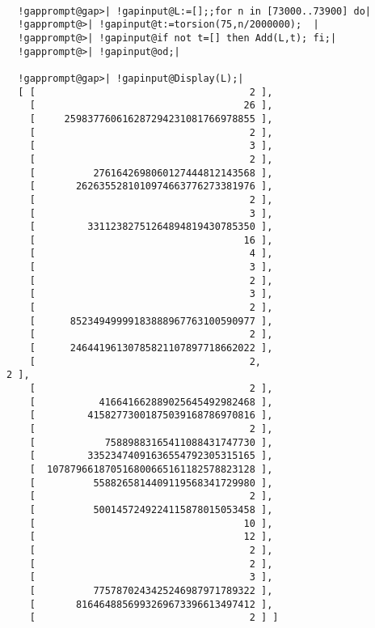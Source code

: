 \documentclass[a4paper,11pt]{report}
\begin{document}
{{\begin{Verbatim}[commandchars=!@|,fontsize=\small,frame=single,label=Example]
  
  !gapprompt@gap>| !gapinput@L:=[];;for n in [73000..73900] do|
  !gapprompt@>| !gapinput@t:=torsion(75,n/2000000);  |
  !gapprompt@>| !gapinput@if not t=[] then Add(L,t); fi;|
  !gapprompt@>| !gapinput@od;|
  
  !gapprompt@gap>| !gapinput@Display(L);|
  [ [                                     2 ],
    [                                    26 ],
    [     259837760616287294231081766978855 ],
    [                                     2 ],
    [                                     3 ],
    [                                     2 ],
    [          2761642698060127444812143568 ],
    [       2626355281010974663776273381976 ],
    [                                     2 ],
    [                                     3 ],
    [         33112382751264894819430785350 ],
    [                                    16 ],
    [                                     4 ],
    [                                     3 ],
    [                                     2 ],
    [                                     3 ],
    [                                     2 ],
    [      85234949999183888967763100590977 ],
    [                                     2 ],
    [      24644196130785821107897718662022 ],
    [                                     2,                                     2 ],
    [                                     2 ],
    [           416641662889025645492982468 ],
    [         41582773001875039168786970816 ],
    [                                     2 ],
    [            75889883165411088431747730 ],
    [         33523474091636554792305315165 ],
    [  107879661870516800665161182578823128 ],
    [          5588265814409119568341729980 ],
    [                                     2 ],
    [          5001457249224115878015053458 ],
    [                                    10 ],
    [                                    12 ],
    [                                     2 ],
    [                                     2 ],
    [                                     3 ],
    [          7757870243425246987971789322 ],
    [       8164648856993269673396613497412 ],
    [                                     2 ] ]
  
\end{Verbatim}
 }

 }

 
\end{document}

